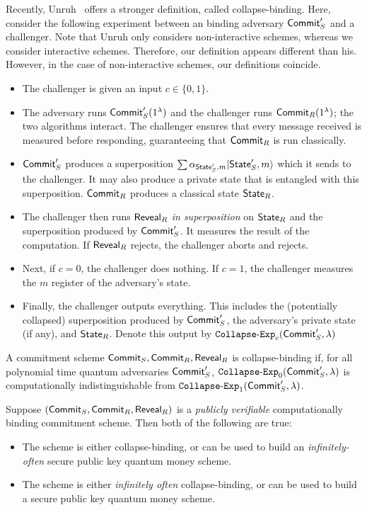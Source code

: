 Recently, Unruh~\cite{EC:Unruh16} offers a stronger definition, called collapse-binding.  Here, consider the following experiment between an binding adversary ${\sf Commit}_S'$ and a challenger.  Note that Unruh only considers non-interactive schemes, whereas we consider interactive schemes.  Therefore, our definition appears different than his.  However, in the case of non-interactive schemes, our definitions coincide.
\begin{itemize}
	\item The challenger is given an input $c\in\{0,1\}$.
	\item The adversary runs ${\sf Commit}_S'(1^\lambda)$ and the challenger runs ${\sf Commit}_R(1^\lambda)$; the two algorithms interact.  The challenger ensures that every message received is measured before responding, guaranteeing that ${\sf Commit}_R$ is run classically. 
	\item ${\sf Commit}_S'$ produces a superposition $\sum \alpha_{{\sf State}_S',m}|{\sf State}_S',m\rangle$ which it sends to the challenger.  It may also produce a private state that is entangled with this superposition.  ${\sf Commit}_R$ produces a classical state ${\sf State}_R$.
	\item The challenger then runs ${\sf Reveal}_R$ \emph{in superposition} on ${\sf State}_R$ and the superposition produced by ${\sf Commit}_S'$.  It measures the result of the computation.  If ${\sf Reveal}_R$ rejects, the challenger aborts and rejects.
	
	\item Next, if $c=0$, the challenger does nothing.  If $c=1$, the challenger measures the $m$ register of the adversary's state.
	\item Finally, the challenger outputs everything.  This includes the (potentially collapsed) superposition produced by ${\sf Commit}_S'$, the adversary's private state (if any), and ${\sf State}_R$.  Denote this output by ${\tt{Collapse\text{-}Exp}}_c({\sf Commit}_S',\lambda)$
\end{itemize}

\begin{definition} A commitment scheme ${\sf Commit}_S,{\sf Commit}_R,{\sf Reveal}_R$ is collapse-binding if, for all polynomial time quantum adversaries ${\sf Commit}_S'$, ${\tt{Collapse\text{-}Exp}}_0({\sf Commit}_S',\lambda)$ is computationally indistinguishable from ${\tt{Collapse\text{-}Exp}}_1({\sf Commit}_S',\lambda)$.
\end{definition}

\begin{theorem}\label{thm:comm} Suppose $({\sf Commit}_S,{\sf Commit}_R,{\sf Reveal}_R)$ is a \emph{publicly verifiable} computationally binding commitment scheme.  Then both of the following are true:
	\begin{itemize}
		\item The scheme is either collapse-binding, or can be used to build an \emph{infinitely-often} secure  public key quantum money scheme.
		\item The scheme is either \emph{infinitely often} collapse-binding, or can be used to build a secure public key quantum money scheme.
	\end{itemize}
\end{theorem}

